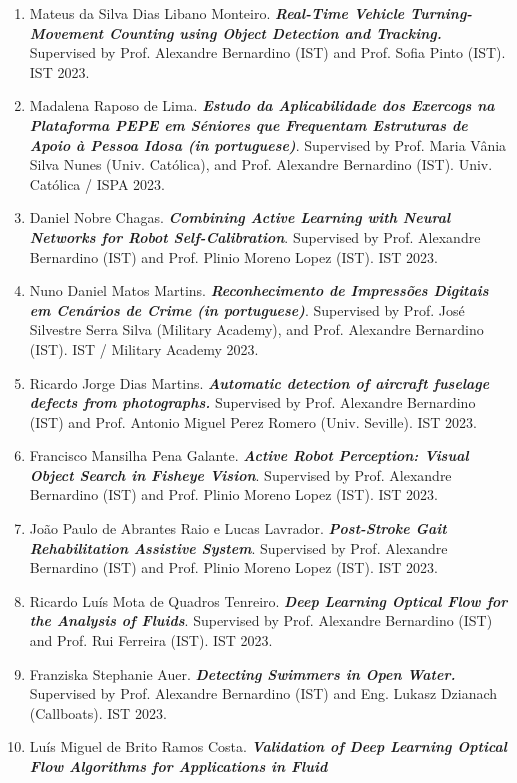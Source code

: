 \documentclass[
]{article}
\begin{document}
\begin{enumerate}
\item
  Mateus da Silva Dias Libano Monteiro. \emph{\textbf{Real-Time Vehicle
  Turning-Movement Counting using Object Detection and Tracking.}}
  Supervised by Prof. Alexandre Bernardino (IST) and Prof. Sofia Pinto
  (IST). IST 2023.
\item
  Madalena Raposo de Lima. \emph{\textbf{Estudo da Aplicabilidade dos
  Exercogs na Plataforma PEPE em Séniores que Frequentam Estruturas de
  Apoio à Pessoa Idosa (in portuguese)}}. Supervised by Prof. Maria
  Vânia Silva Nunes (Univ. Católica), and Prof. Alexandre Bernardino
  (IST). Univ. Católica / ISPA 2023.
\item
  Daniel Nobre Chagas. \emph{\textbf{Combining Active Learning with
  Neural Networks for Robot Self-Calibration}}. Supervised by Prof.
  Alexandre Bernardino (IST) and Prof. Plinio Moreno Lopez (IST). IST
  2023.
\item
  Nuno Daniel Matos Martins. \emph{\textbf{Reconhecimento de Impressões
  Digitais em Cenários de Crime (in portuguese)}}. Supervised by Prof.
  José Silvestre Serra Silva (Military Academy), and Prof. Alexandre
  Bernardino (IST). IST / Military Academy 2023.
\item
  Ricardo Jorge Dias Martins. \emph{\textbf{Automatic detection of
  aircraft fuselage defects from photographs.}} Supervised by Prof.
  Alexandre Bernardino (IST) and Prof. Antonio Miguel Perez Romero
  (Univ. Seville). IST 2023.
\item
  Francisco Mansilha Pena Galante. \emph{\textbf{Active Robot
  Perception: Visual Object Search in Fisheye Vision}}. Supervised by
  Prof. Alexandre Bernardino (IST) and Prof. Plinio Moreno Lopez (IST).
  IST 2023.
\item
  João Paulo de Abrantes Raio e Lucas Lavrador.
  \emph{\textbf{Post-Stroke Gait Rehabilitation Assistive System}}.
  Supervised by Prof. Alexandre Bernardino (IST) and Prof. Plinio Moreno
  Lopez (IST). IST 2023.
\item
  Ricardo Luís Mota de Quadros Tenreiro. \emph{\textbf{Deep Learning
  Optical Flow for the Analysis of Fluids}}. Supervised by Prof.
  Alexandre Bernardino (IST) and Prof. Rui Ferreira (IST). IST 2023.
\item
  Franziska Stephanie Auer. \emph{\textbf{Detecting Swimmers in Open
  Water.}} Supervised by Prof. Alexandre Bernardino (IST) and Eng.
  Lukasz Dzianach (Callboats). IST 2023.
\item
  Luís Miguel de Brito Ramos Costa. \emph{\textbf{Validation of Deep
  Learning Optical Flow Algorithms for Applications in Fluid
}}
\end{enumerate}
\end{document}
